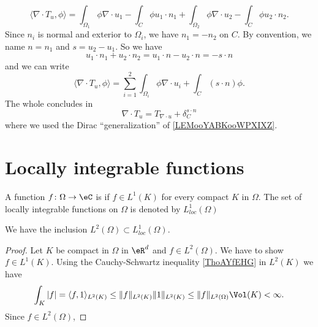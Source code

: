 \begin{equation}
    \langle \nabla\cdot T_u, \phi\rangle =\int_{\Omega_1}\phi\nabla\cdot u_1-\int_C\phi u_1\cdot n_1+\int_{\Omega_2}\phi\nabla\cdot u_2-\int_C\phi u_2\cdot n_2.
\end{equation}
Since \( n_i\) is normal and exterior to \( \Omega_i\), we have \( n_1=-n_2\) on \( C\). By convention, we name \( n=n_1\) and \( s=u_2-u_1\). So we have
\begin{equation}
    u_1\cdot n_1+u_2\cdot n_2=u_1\cdot n-u_2\cdot n=-s\cdot n
\end{equation}
and we can write
\begin{equation}
    \langle \nabla\cdot T_u, \phi\rangle =\sum_{i=1}^2\int_{\Omega_i}\phi\nabla\cdot u_i+\int_C(s\cdot n)\phi.
\end{equation}
The whole concludes in
\begin{equation}
    \nabla\cdot T_u=T_{\nabla\cdot u}+\delta_C^{s\cdot n}
\end{equation}
where we used the Dirac ``generalization'' of \ref{LEMooYABKooWPXIXZ}.

\section{Locally integrable functions}

\begin{definition}
    A function \( f\colon \Omega\to \eC\) is  if \( f\in L^1(K)\) for every compact \( K\) in \( \Omega\). The set of locally integrable functions on \( \Omega\) is denoted by \( L^1_{loc}(\Omega)\)
\end{definition}

\begin{proposition}
    We have the inclusion \( L^2(\Omega)\subset L^1_{loc}(\Omega)\).
\end{proposition}

\begin{proof}
    Let \( K\) be compact in \( \Omega\) in \( \eR^d\) and \( f\in L^2(\Omega)\). We have to show \( f\in L^1(K)\). Using the Cauchy-Schwartz inequality \ref{ThoAYfEHG} in \( L^2(K)\) we have
    \begin{equation}
        \int_K| f |=\langle f, 1\rangle_{L^2(K)} \leq \| f \|_{L^2(K)}\| 1 \|_{L^2(K)}\leq \| f \|_{L^2(\Omega)}\Vol(K)<\infty.
    \end{equation}
    Since \( f\in L^2(\Omega)\), 
\end{proof}

